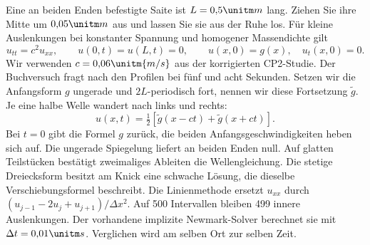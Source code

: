 Eine an beiden Enden befestigte Saite ist \(L=0{,}5\unitm m\) lang. Ziehen Sie ihre Mitte um \(0{,}05\unitm m\) aus und lassen Sie sie aus der Ruhe los. Für kleine Auslenkungen bei konstanter Spannung und homogener Massendichte gilt
\[
 u_{tt}=c^2u_{xx},\qquad u(0,t)=u(L,t)=0,\qquad u(x,0)=g(x),\quad u_t(x,0)=0 .
\]
Wir verwenden \(c=0{,}06\unitm{m/s}\) aus der korrigierten CP2-Studie. Der Buchversuch fragt nach den Profilen bei fünf und acht Sekunden.
Setzen wir die Anfangsform \(g\) ungerade und \(2L\)-periodisch fort, nennen wir diese Fortsetzung \(\tilde g\). Je eine halbe Welle wandert nach links und rechts:
\[
 u(x,t)=\tfrac12[\tilde g(x-ct)+\tilde g(x+ct)] .
\]
Bei \(t=0\) gibt die Formel \(g\) zurück, die beiden Anfangsgeschwindigkeiten heben sich auf. Die ungerade Spiegelung liefert an beiden Enden null. Auf glatten Teilstücken bestätigt zweimaliges Ableiten die Wellengleichung. Die stetige Dreiecksform besitzt am Knick eine schwache Lösung, die dieselbe Verschiebungsformel beschreibt.
Die Linienmethode ersetzt \(u_{xx}\) durch \((u_{j-1}-2u_j+u_{j+1})/\Delta x^2\). Auf 500 Intervallen bleiben 499 innere Auslenkungen. Der vorhandene implizite Newmark-Solver berechnet sie mit \(\Delta t=0{,}01\unitm s\). Verglichen wird am selben Ort zur selben Zeit.

